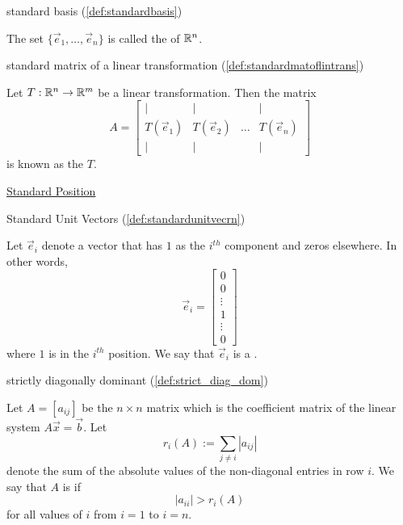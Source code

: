 \documentclass{ximera}
\begin{document}
standard basis (\ref{def:standardbasis})
\begin{expandable}{}{}
    The set $\{\vec{e}_1, \ldots ,\vec{e}_n\}$ is called the  of $\mathbb{R}^n$.
\end{expandable}

standard matrix of a linear transformation (\ref{def:standardmatoflintrans})
\begin{expandable}{}{}
    Let $T:\mathbb{R}^n\rightarrow\mathbb{R}^m$ be a linear transformation.  Then the matrix
  \begin{equation*} \label{matlintrans}
 A=\begin{bmatrix}
           | & |& &|\\
		T(\vec{e}_1) & T(\vec{e}_2)&\dots &T(\vec{e}_n)\\
		|&| & &|
         \end{bmatrix}
\end{equation*}
is known as the  $T$.
\end{expandable}

\href{https://ximera.osu.edu/linearalgebradzv3/LinearAlgebraInteractiveIntro/VEC-0010/main}{Standard Position}

Standard Unit Vectors (\ref{def:standardunitvecrn})
\begin{expandable}{}{}
  Let $\vec{e}_i$ denote a vector that has $1$ as the $i^{th}$ component and zeros elsewhere.  In other words, $$\vec{e}_i=\begin{bmatrix}
0\\
0\\
\vdots\\
1\\
\vdots\\
0
\end{bmatrix}$$ 
  where $1$ is in the $i^{th}$ position.  We say that  $\vec{e}_i$ is a .
\end{expandable}

strictly diagonally dominant (\ref{def:strict_diag_dom})
\begin{expandable}{}{}
    Let $A=[a_{ij}]$ be the $n\times n$ matrix which is the coefficient matrix of the linear system $A \vec{x}= \vec{b}$.  Let
$$
r_i(A):= \sum_{j \ne i} |a_{ij}|
$$
denote the sum of the absolute values of the non-diagonal entries in row $i$.  We say that $A$ is  if 
$$|a_{ii}|>r_i(A)$$
for all values of $i$ from $i=1$ to $i=n$.
\end{expandable}
\end{document}
